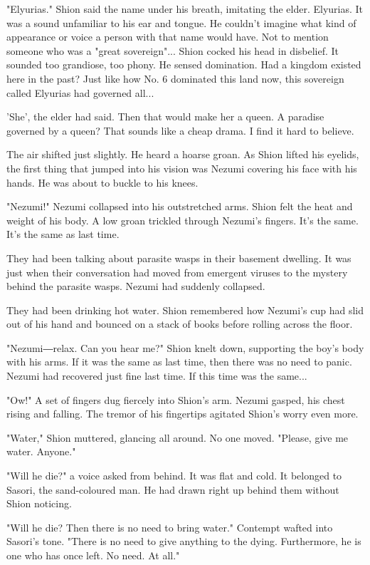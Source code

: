 "Elyurias." Shion said the name under his breath, imitating the elder.
Elyurias. It was a sound unfamiliar to his ear and tongue. He couldn't
imagine what kind of appearance or voice a person with that name would
have. Not to mention someone who was a "great sovereign"... Shion cocked
his head in disbelief. It sounded too grandiose, too phony. He sensed
domination. Had a kingdom existed here in the past? Just like how No. 6
dominated this land now, this sovereign called Elyurias had governed
all...

'She', the elder had said. Then that would make her a queen. A paradise
governed by a queen? That sounds like a cheap drama. I find it hard to
believe.

The air shifted just slightly. He heard a hoarse groan. As Shion lifted
his eyelids, the first thing that jumped into his vision was Nezumi
covering his face with his hands. He was about to buckle to his knees.

"Nezumi!" Nezumi collapsed into his outstretched arms. Shion felt the
heat and weight of his body. A low groan trickled through Nezumi's
fingers. It's the same. It's the same as last time.

They had been talking about parasite wasps in their basement dwelling.
It was just when their conversation had moved from emergent viruses to
the mystery behind the parasite wasps. Nezumi had suddenly collapsed.

They had been drinking hot water. Shion remembered how Nezumi's cup had
slid out of his hand and bounced on a stack of books before rolling
across the floor.

"Nezumi―relax. Can you hear me?" Shion knelt down, supporting the boy's
body with his arms. If it was the same as last time, then there was no
need to panic. Nezumi had recovered just fine last time. If this time
was the same...~

"Ow!" A set of fingers dug fiercely into Shion's arm. Nezumi gasped, his
chest rising and falling. The tremor of his fingertips agitated Shion's
worry even more.

"Water," Shion muttered, glancing all around. No one moved. "Please,
give me water. Anyone."

"Will he die?" a voice asked from behind. It was flat and cold. It
belonged to Sasori, the sand-coloured man. He had drawn right up behind
them without Shion noticing.

"Will he die? Then there is no need to bring water." Contempt wafted
into Sasori's tone. "There is no need to give anything to the dying.
Furthermore, he is one who has once left. No need. At all."

